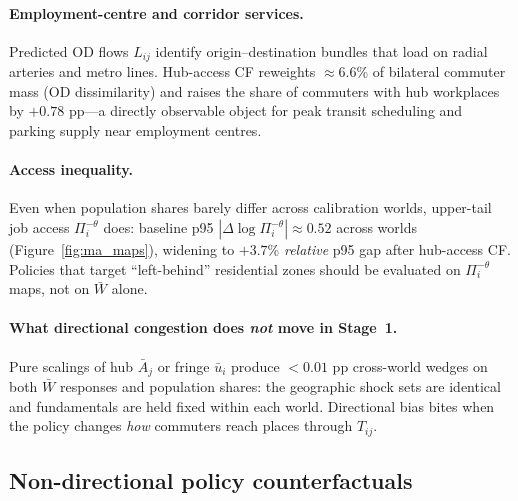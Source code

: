 \documentclass[12pt]{article}
\newcommand{\Wbar}{\bar W}
\begin{document}
\paragraph{Employment-centre and corridor services.}
Predicted OD flows $L_{ij}$ identify origin--destination bundles that load on radial
arteries and metro lines.
Hub-access CF reweights $\approx 6.6\%$ of bilateral commuter mass (OD dissimilarity)
and raises the share of commuters with hub workplaces by $+0.78$ pp---a directly
observable object for peak transit scheduling and parking supply near employment centres.

\paragraph{Access inequality.}
Even when population shares barely differ across calibration worlds, upper-tail job
access $\Pi_i^{-\theta}$ does: baseline p95 $|\Delta\log\Pi_i^{-\theta}|\approx 0.52$
across worlds (Figure~\ref{fig:ma_maps}), widening to $+3.7\%$ \emph{relative} p95 gap
after hub-access CF.
Policies that target ``left-behind'' residential zones should be evaluated on
$\Pi_i^{-\theta}$ maps, not on $\Wbar$ alone.

\paragraph{What directional congestion does \emph{not} move in Stage~1.}
Pure scalings of hub $\bar A_j$ or fringe $\bar u_i$ produce $<0.01$ pp cross-world
wedges on both $\Wbar$ responses and population shares: the geographic shock sets are
identical and fundamentals are held fixed within each world.
Directional bias bites when the policy changes \emph{how} commuters reach places
through $T_{ij}$.

\subsection{Non-directional policy counterfactuals}\label{sec:policy_cf}
\end{document}

